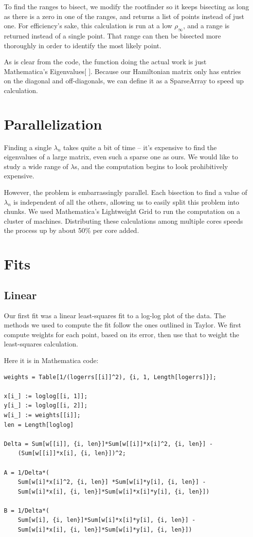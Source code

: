 \documentclass[12pt,twoside]{reedthesis}
\begin{document}
To find the ranges to bisect, we modify the rootfinder so it keeps bisecting as long as there is a zero in one of the ranges, and returns a list of points instead of just one. For efficiency's sake, this calculation is run at a low $\rho_{\infty}$, and a range is returned instead of a single point. That range can then be bisected more thoroughly in order to identify the most likely point. 

As is clear from the code, the function doing the actual work is just Mathematica's Eigenvalues[ ]. Because our Hamiltonian matrix only has entries on the diagonal and off-diagonals, we can define it as a SparseArray to speed up calculation. 

\section{Parallelization}

Finding a single $\lambda_{n}$ takes quite a bit of time -- it's expensive to find the eigenvalues of a large matrix, even such a sparse one as ours. We would like to study a wide range of $\lambda$s, and the computation begins to look prohibitively expensive.

However, the problem is embarrassingly parallel. Each bisection to find a value of $\lambda_n$ is independent of all the others, allowing us to easily split this problem into chunks. We used Mathematica's Lightweight Grid to run the computation on a cluster of machines. Distributing these calculations among multiple cores speeds the process up by about 50\% per core added. 

\section{Fits}
\subsection{Linear}
Our first fit was a linear least-squares fit  to a log-log plot of the data. The methods we used to compute the fit follow the ones outlined in Taylor\cite{taylor_introduction_1997}. We first compute weights for each point, based on its error, then use that to weight the least-squares calculation.

Here it is in Mathematica code:
\begin{Verbatim}
weights = Table[1/(logerrs[[i]]^2), {i, 1, Length[logerrs]}];

x[i_] := loglog[[i, 1]];
y[i_] := loglog[[i, 2]];
w[i_] := weights[[i]]; 
len = Length[loglog]

Delta = Sum[w[[i]], {i, len}]*Sum[w[[i]]*x[i]^2, {i, len}] -
	(Sum[w[[i]]*x[i], {i, len}])^2;

A = 1/Delta*(
	Sum[w[i]*x[i]^2, {i, len}] *Sum[w[i]*y[i], {i, len}] - 
	Sum[w[i]*x[i], {i, len}]*Sum[w[i]*x[i]*y[i], {i, len}])
	
B = 1/Delta*(
	Sum[w[i], {i, len}]*Sum[w[i]*x[i]*y[i], {i, len}] - 
	Sum[w[i]*x[i], {i, len}]*Sum[w[i]*y[i], {i, len}])
\end{Verbatim}
\end{document}
